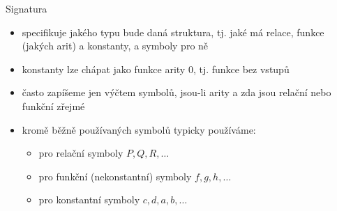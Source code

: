 \documentclass{beamer}
\begin{document}
\begin{frame}{Signatura}

    \begin{itemize}
        \item specifikuje jakého \alert{typu} bude daná struktura, tj. jaké  má relace, funkce (jakých arit) a konstanty, a symboly pro ně \pause
        \item \alert{konstanty} lze chápat jako funkce arity 0, tj. funkce bez vstupů\pause
    \end{itemize}


    \bigskip

    \begin{itemize}
        \item často zapíšeme jen výčtem symbolů, jsou-li arity a zda jsou relační nebo funkční zřejmé\pause
        \item kromě běžně používaných symbolů typicky používáme:\pause
        \begin{itemize}
            \item pro relační symboly $P,Q,R,\dots$\pause
            \item pro funkční (nekonstantní) symboly $f,g,h,\dots$\pause
            \item pro konstantní symboly $c,d,a,b,\dots$
        \end{itemize}
    \end{itemize}
    

\end{frame}
\end{document}
